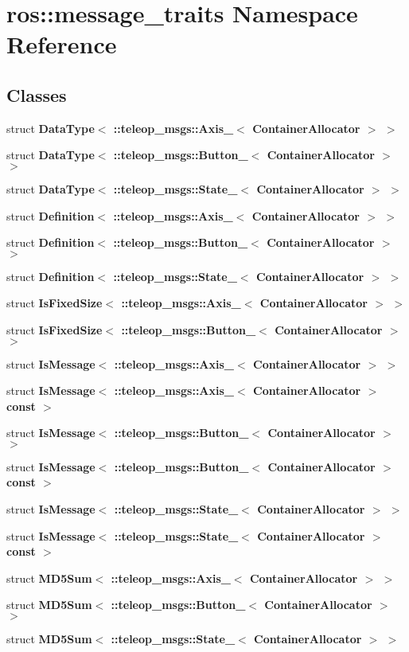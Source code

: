 \section{ros::message\_\-traits Namespace Reference}
\label{namespaceros_1_1message__traits}
\subsection*{Classes}
\begin{DoxyCompactItemize}
\item 
struct {\bf DataType$<$ ::teleop\_\-msgs::Axis\_\-$<$ ContainerAllocator $>$ $>$}
\item 
struct {\bf DataType$<$ ::teleop\_\-msgs::Button\_\-$<$ ContainerAllocator $>$ $>$}
\item 
struct {\bf DataType$<$ ::teleop\_\-msgs::State\_\-$<$ ContainerAllocator $>$ $>$}
\item 
struct {\bf Definition$<$ ::teleop\_\-msgs::Axis\_\-$<$ ContainerAllocator $>$ $>$}
\item 
struct {\bf Definition$<$ ::teleop\_\-msgs::Button\_\-$<$ ContainerAllocator $>$ $>$}
\item 
struct {\bf Definition$<$ ::teleop\_\-msgs::State\_\-$<$ ContainerAllocator $>$ $>$}
\item 
struct {\bf IsFixedSize$<$ ::teleop\_\-msgs::Axis\_\-$<$ ContainerAllocator $>$ $>$}
\item 
struct {\bf IsFixedSize$<$ ::teleop\_\-msgs::Button\_\-$<$ ContainerAllocator $>$ $>$}
\item 
struct {\bf IsMessage$<$ ::teleop\_\-msgs::Axis\_\-$<$ ContainerAllocator $>$ $>$}
\item 
struct {\bf IsMessage$<$ ::teleop\_\-msgs::Axis\_\-$<$ ContainerAllocator $>$const  $>$}
\item 
struct {\bf IsMessage$<$ ::teleop\_\-msgs::Button\_\-$<$ ContainerAllocator $>$ $>$}
\item 
struct {\bf IsMessage$<$ ::teleop\_\-msgs::Button\_\-$<$ ContainerAllocator $>$const  $>$}
\item 
struct {\bf IsMessage$<$ ::teleop\_\-msgs::State\_\-$<$ ContainerAllocator $>$ $>$}
\item 
struct {\bf IsMessage$<$ ::teleop\_\-msgs::State\_\-$<$ ContainerAllocator $>$const  $>$}
\item 
struct {\bf MD5Sum$<$ ::teleop\_\-msgs::Axis\_\-$<$ ContainerAllocator $>$ $>$}
\item 
struct {\bf MD5Sum$<$ ::teleop\_\-msgs::Button\_\-$<$ ContainerAllocator $>$ $>$}
\item 
struct {\bf MD5Sum$<$ ::teleop\_\-msgs::State\_\-$<$ ContainerAllocator $>$ $>$}
\end{DoxyCompactItemize}
